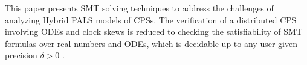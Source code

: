 
This paper presents SMT solving techniques to address the challenges
of analyzing Hybrid PALS models of CPSs. The verification of
a distributed CPS involving ODEs and clock skews is reduced to
checking the satisfiability of SMT formulas over real numbers and
ODEs, which 
 is decidable up to any user-given precision $\delta > 0$ \cite{delta-comp,sat-ode}.



